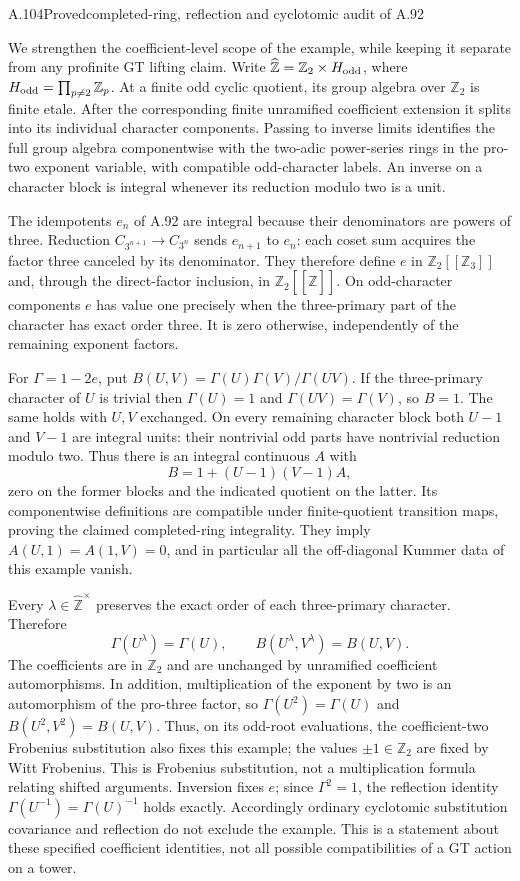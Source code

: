 \begin{statement}{A.104}{Proved}{completed-ring, reflection and cyclotomic audit of A.92}
\end{statement}
We strengthen the coefficient-level scope of the example, while
keeping it separate from any profinite GT lifting claim.
Write $\widehat{\mathbb Z}=\mathbb Z_2\times H_{\rm odd}$,
where $H_{\rm odd}=\prod_{p\ne2}\mathbb Z_p$.
At a finite odd cyclic quotient, its group algebra over
$\mathbb Z_2$ is finite etale. After the corresponding finite
unramified coefficient extension it splits into its individual
character components. Passing to inverse limits identifies
the full group algebra componentwise with the two-adic
power-series rings in the pro-two exponent variable, with
compatible odd-character labels. An inverse on a character block
is integral whenever its reduction modulo two is a unit.

The idempotents $e_n$ of A.92 are integral because their
denominators are powers of three. Reduction
$C_{3^{n+1}}\to C_{3^n}$ sends $e_{n+1}$ to $e_n$:
each coset sum acquires the factor three canceled by its
denominator. They therefore define $e$ in
$\mathbb Z_2[[\mathbb Z_3]]$ and, through the direct-factor
inclusion, in $\mathbb Z_2[[\widehat{\mathbb Z}]]$.
On odd-character components $e$ has value one precisely when
the three-primary part of the character has exact order three.
It is zero otherwise, independently of the remaining exponent factors.

For $\Gamma=1-2e$, put
$B(U,V)=\Gamma(U)\Gamma(V)/\Gamma(UV)$.
If the three-primary character of $U$ is trivial then
$\Gamma(U)=1$ and $\Gamma(UV)=\Gamma(V)$, so $B=1$.
The same holds with $U,V$ exchanged. On every remaining
character block both $U-1$ and $V-1$ are integral units:
their nontrivial odd parts have nontrivial reduction modulo two.
Thus there is an integral continuous $A$ with
\[
 B=1+(U-1)(V-1)A,
\]
zero on the former blocks and the indicated quotient on the latter.
Its componentwise definitions are compatible under finite-quotient
transition maps, proving the claimed completed-ring integrality.
They imply $A(U,1)=A(1,V)=0$, and in particular all the
off-diagonal Kummer data of this example vanish.

Every $\lambda\in\widehat{\mathbb Z}^{\times}$ preserves the
exact order of each three-primary character. Therefore
\[
 \Gamma(U^\lambda)=\Gamma(U),\qquad
 B(U^\lambda,V^\lambda)=B(U,V).
\]
The coefficients are in $\mathbb Z_2$ and are unchanged by
unramified coefficient automorphisms. In addition, multiplication
of the exponent by two is an automorphism of the pro-three
factor, so $\Gamma(U^2)=\Gamma(U)$ and
$B(U^2,V^2)=B(U,V)$. Thus, on its odd-root evaluations, the
coefficient-two Frobenius substitution also fixes this example;
the values $\pm1\in\mathbb Z_2$ are fixed by Witt Frobenius.
This is Frobenius substitution, not a multiplication formula
relating shifted arguments. Inversion fixes $e$;
since $\Gamma^2=1$, the reflection identity
$\Gamma(U^{-1})=\Gamma(U)^{-1}$ holds exactly.
Accordingly ordinary cyclotomic substitution covariance and
reflection do not exclude the example. This is a statement about
these specified coefficient identities, not all possible
compatibilities of a GT action on a tower.

